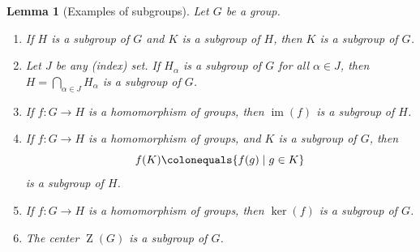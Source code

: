 \documentclass[12pt]{report}
\newtheorem{lemma}[theorem]{Lemma}
\numberwithin{equation}{section}
\numberwithin{theorem}{chapter}
\theoremstyle{definition}
\newtheorem*{basic properties}{Basic Properties}
\newtheorem*{Important Remark}{Important Remark}
\renewcommand{\ker}{\operatorname{ker}}
\DeclareMathOperator{\im}{im}
\DeclareMathOperator{\Zc}{Z}
\begin{document}
\begin{lemma}[Examples of subgroups]\label{subgroups examples}
Let $G$ be a group.
\vspace{-0.3em}
\begin{enumerate}[leftmargin=20pt,itemsep=-0.1em,label=(\alph*)]
\item If $H$ is a subgroup of $G$ and $K$ is a subgroup of $H$, then $K$ is a subgroup of $G$. 
\item Let $J$ be any (index) set. If $H_\alpha$ is a subgroup of $G$ for all $\alpha \in J$, then $H=\bigcap_{\alpha\in J} H_\alpha$ is a subgroup of $G$.
 \item If $f: G \to H$ is a homomorphism of groups, then $\im(f)$ is a subgroup of $H$.
 \item If $f: G \to H$ is a homomorphism of groups, and $K$ is a subgroup of $G$, then 
 $$f(K) \colonequals \{ f(g) \mid g \in K \}$$
is a subgroup of $H$.
 \item If $f: G \to H$ is a homomorphism of groups, then $\ker(f)$ is a subgroup of $G$.
 \item The center $\Zc(G)$ is a subgroup of $G$.
\end{enumerate}
\end{lemma}
\end{document}
